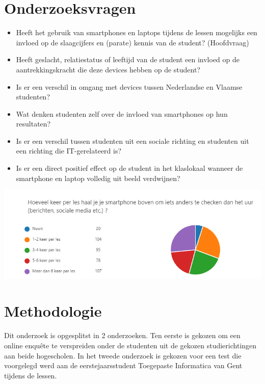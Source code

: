 \documentclass[a0,portrait]{a0poster}
\begin{document}
\begin{multicols}{2}
\section*{Onderzoeksvragen}
\color{black}
\begin{itemize}
	\item Heeft het gebruik van smartphones en laptops tijdens de lessen mogelijks een invloed op de slaagcijfers en (parate) kennis van de student? (Hoofdvraag)
	\item Heeft geslacht, relatiestatus of leeftijd van de student een invloed op de aantrekkingskracht die deze devices hebben op de student?
	\item Is er een verschil in omgang met devices tussen Nederlandse en Vlaamse studenten?
	\item Wat denken studenten zelf over de invloed van smartphones op hun resultaten?
	\item Is er een verschil tussen studenten uit een sociale richting en studenten uit een richting die IT-gerelateerd is?
	\item Is er een direct positief effect op de student in het klaslokaal wanneer de smartphone en laptop volledig uit beeld verdwijnen?
\end{itemize}
\begin{center}\vspace{1cm}
	\includegraphics[width=1.0\linewidth]{smartphone-social.png}
\end{center}\vspace{1cm}

\color{HoGentAccent1} 
\section*{Methodologie}
\color{black}
Dit onderzoek is opgesplitst in 2 onderzoeken. Ten eerste is gekozen om een online enquête te verspreiden onder de studenten uit de gekozen studierichtingen aan beide hogescholen. In het tweede
onderzoek is gekozen voor een test die voorgelegd werd aan de eerstejaarsstudent Toegepaste Informatica van Gent tijdens de lessen. 
\color{HoGentAccent1} 

\end{multicols}
\end{document}
